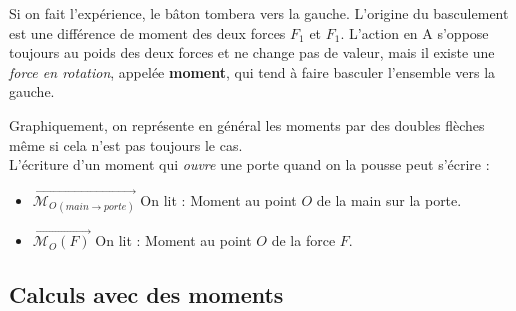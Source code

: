 \documentclass[
	11pt, %
	fleqn, %
	a4paper, %
]{LegrandOrangeBook}
\begin{document}
Si on fait l'expérience, le bâton tombera vers la gauche. L’origine du basculement est une différence de moment des deux forces $F_1$ et $F_1$. L’action en A s’oppose toujours au poids des deux forces et ne change pas de valeur, mais il existe une \textit{force en rotation}, appelée \textbf{moment}, qui tend à faire basculer l’ensemble vers la gauche.

Graphiquement, on représente en général les moments par des doubles flèches même si cela n'est pas toujours le cas.\\

\noindent L'écriture d'un moment qui \textit{ouvre} une porte quand on la pousse peut s'écrire :\\
\begin{itemize}

\item $\overrightarrow{\mathcal{M}_{O}{}_{\left( main\rightarrow porte\right)}}$ 
\noindent On lit : Moment au point $O$ de la main sur la porte.

\item $\overrightarrow{\mathcal{M}_{O}{(F)}}$
\noindent On lit : Moment au point $O$ de la force $F$.

\end{itemize}
\subsection*{Calculs avec des moments}
\end{document}
